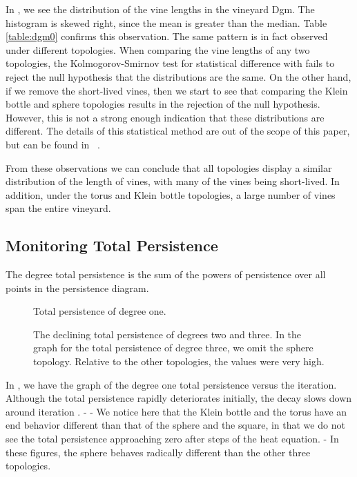 In , we see the distribution of the vine lengths in 
the vineyard Dgm.  The histogram is skewed right, since the mean is 
greater than the median.  Table \ref{table:dgm0} confirms this observation.  
The same pattern is in fact observed under different topologies.  When 
comparing the vine lengths of any two topologies, the Kolmogorov-Smirnov test 
for statistical difference with  fails to reject the null 
hypothesis that the distributions are the same.  On the other hand, if we 
remove the short-lived vines, then we start to see that comparing the Klein
bottle and sphere topologies results in the rejection of the null hypothesis.   
However, this is not a strong enough indication that these distributions are 
different.  The details of this statistical method are out of the scope of 
this paper, but can be found in ~\cite{massey1951kolmogorov}.

From these observations we can conclude that all topologies display a similar
distribution of the length of vines, with many of the vines being short-lived.  
In addition, under the torus and Klein bottle topologies, a large number
of vines span the entire vineyard.

\subsection{Monitoring Total Persistence}
The degree  total persistence is the sum  of the  powers of 
persistence over all points in the persistence diagram.
\begin{figure}[hbt]
 \vspace*{0.1in}
 \centering
 \centerline{}
 \caption{Total persistence of degree one.}
 \label{fig:totalPersis}
\end{figure}
\begin{figure}[hbt]
	\centering
 \caption{The declining total persistence of degrees two and three.  In the graph for
          the total persistence of degree three, we omit the sphere topology.  Relative
          to the other topologies, the values were very high.}
 \label{fig:totalPersis23}
\end{figure}
In , we have the graph of the degree one total persistence
versus the iteration.  Although the total persistence rapidly 
deteriorates initially, the decay slows down around iteration .
-
-
We notice here that the Klein bottle and the
torus have an end behavior different than that of the sphere and the square,
in that we do not see the total persistence approaching zero
after  steps of the heat equation.  
-
In these figures, the sphere behaves
radically different than the other three topologies.

